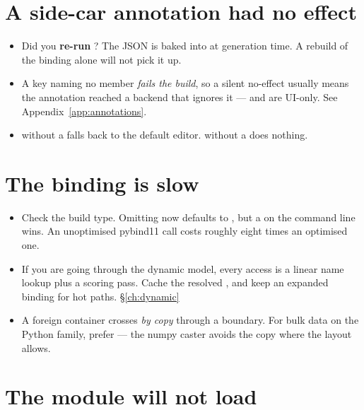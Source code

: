 \section{A side-car annotation had no effect}

\begin{itemize}
  \item Did you \textbf{re-run }? The JSON is baked into
     at generation time. A rebuild of the binding alone will
    not pick it up.
  \item A key naming no member \emph{fails the build}, so a silent no-effect
    usually means the annotation reached a backend that ignores it ---
     and  are UI-only. See
    Appendix~\ref{app:annotations}.
  \item {} without a  falls back to the default
    editor.  without a  does nothing.
\end{itemize}

\section{The binding is slow}

\begin{itemize}
  \item Check the build type. Omitting  now defaults to
    , but a  on the command line
    wins. An unoptimised pybind11 call costs roughly eight times an optimised
    one.
  \item If you are going through the dynamic model, every access is a linear
    name lookup plus a scoring pass. Cache the resolved , and
    keep an expanded binding for hot paths. \S\ref{ch:dynamic}
  \item A foreign container crosses \emph{by copy} through a
     boundary. For bulk data on the Python family, prefer
     --- the numpy caster avoids the copy where the layout
    allows.
\end{itemize}

\section{The module will not load}

